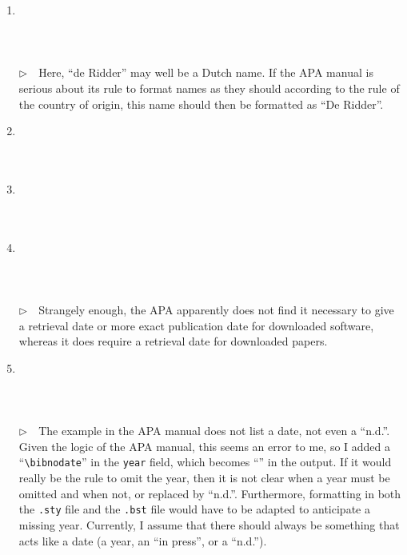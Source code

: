 \documentclass{article}
\newcommand{\EM}{\ensuremath{\triangleright\quad}}
\newcommand{\fname}[1]{\texttt{#1}}%
\newcommand{\fieldname}[1]{\texttt{#1}}%
\begin{document}
\begin{enumerate}
\item \cite{ex90} \\ \cite{ex90}\\ \\  \\
      \EM Here, ``de Ridder'' may well be a Dutch name. If the APA
      manual is serious about its rule to format names as they
      should according to the rule of the country of origin,
      this name should then be formatted as ``De Ridder''.
\item \cite{ex91} \\ \cite{ex91}\\ \\ 
\item \cite{ex92} \\ \cite{ex92}\\ \\ 
\item \cite{ex93} \\ \cite{ex93}\\ \\ \\
      \EM Strangely enough, the APA apparently does not find it necessary
      to give a retrieval date or more exact publication date for
      downloaded software, whereas it does require a retrieval date
      for downloaded papers.
\item \cite{ex94} \\ \cite{ex94}\\ \\ \\
      \EM The example in the APA manual does not list a date, not even
      a ``n.d.''. Given the logic of the APA manual, this seems an error
      to me, so I added a ``\verb+\bibnodate+'' in the \fieldname{year}
      field, which becomes ``\bibnodate'' in the output. If it would
      really be the rule to omit the year, then it is not clear when
      a year must be omitted and when not, or replaced by ``n.d.''.
      Furthermore, formatting in both the \fname{.sty} file and
      the \fname{.bst} file would have to be adapted to anticipate
      a missing year. Currently, I assume that there should always
      be something that acts like a date (a year, an ``in press'',
      or a ``n.d.'').


\end{enumerate}
\end{document}
